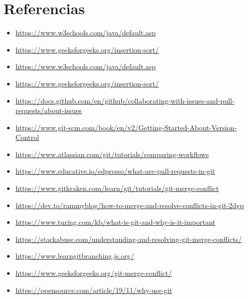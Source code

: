 \documentclass{article}
\begin{document}
\clearpage

\section{Referencias}
\begin{itemize}			
	\item \url{https://www.w3schools.com/java/default.asp}
	\item \url{https://www.geeksforgeeks.org/insertion-sort/}
	\item \url{https://www.w3schools.com/java/default.asp}
	\item \url{https://www.geeksforgeeks.org/insertion-sort/}
	\item \url{https://docs.github.com/en/github/collaborating-with-issues-and-pull-requests/about-issues}
	\item \url{https://www.git-scm.com/book/en/v2/Getting-Started-About-Version-Control}
	\item \url{https://www.atlassian.com/git/tutorials/comparing-workflows}
	\item \url{https://www.educative.io/edpresso/what-are-pull-requests-in-git}
	\item \url{https://www.gitkraken.com/learn/git/tutorials/git-merge-conflict}
	\item \url{https://dev.to/rammyblog/how-to-merge-and-resolve-conflicts-in-git-2dgp}
	\item \url{https://www.turing.com/kb/what-is-git-and-why-is-it-important}
	\item \url{https://stackabuse.com/understanding-and-resolving-git-merge-conflicts/}
	\item \url{https://www.learngitbranching.js.org/}
	\item \url{https://www.geeksforgeeks.org/git-merge-conflict/}
	\item \url{https://opensource.com/article/19/11/why-use-git}
\end{itemize}
	
%
%
%
			
\end{document}
